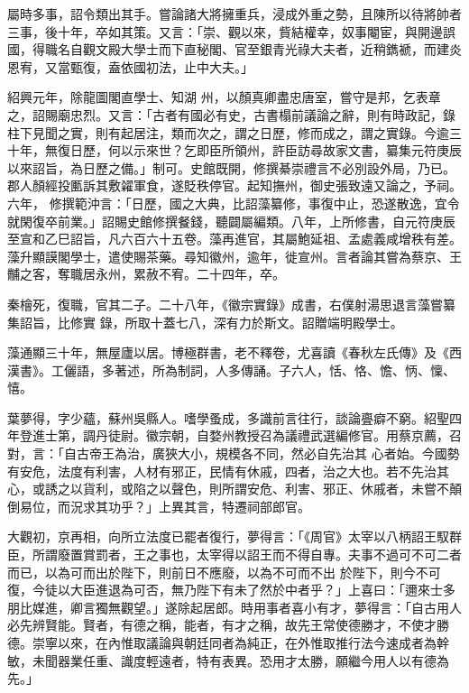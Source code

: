 \begin{pinyinscope}
 屬時多事，詔令類出其手。嘗論諸大將擁重兵，浸成外重之勢，且陳所以待將帥者三事，後十年，卒如其策。又言：「崇、觀以來，貲結權幸，奴事閹宦，與開邊誤國，得職名自觀文殿大學士而下直秘閣、官至銀青光祿大夫者，近稍鐫褫，而建炎恩宥，又當甄復，盍依國初法，止中大夫。」



 紹興元年，除龍圖閣直學士、知湖
 州，以顏真卿盡忠唐室，嘗守是邦，乞表章之，詔賜廟忠烈。又言：「古者有國必有史，古書榻前議論之辭，則有時政記，錄柱下見聞之實，則有起居注，類而次之，謂之日歷，修而成之，謂之實錄。今逾三十年，無復日歷，何以示來世？乞即臣所領州，許臣訪尋故家文書，纂集元符庚辰以來詔旨，為日歷之備。」制可。史館既開，修撰綦崇禮言不必別設外局，乃已。郡人顏經投匭訴其敷糴軍食，遂貶秩停官。起知撫州，御史張致遠又論之，予祠。六年，
 修撰範沖言：「日歷，國之大典，比詔藻纂修，事復中止，恐遂散逸，宜令就閑復卒前業。」詔賜史館修撰餐錢，聽闢屬編類。八年，上所修書，自元符庚辰至宣和乙巳詔旨，凡六百六十五卷。藻再進官，其屬鮑延祖、孟處義咸增秩有差。藻升顯謨閣學士，遣使賜茶藥。尋知徽州，逾年，徙宣州。言者論其嘗為蔡京、王黼之客，奪職居永州，累赦不宥。二十四年，卒。



 秦檜死，復職，官其二子。二十八年，《徽宗實錄》成書，右僕射湯思退言藻嘗纂集詔旨，比修實
 錄，所取十蓋七八，深有力於斯文。詔贈端明殿學士。



 藻通顯三十年，無屋廬以居。博極群書，老不釋卷，尤喜讀《春秋左氏傳》及《西漢書》。工儷語，多著述，所為制詞，人多傳誦。子六人，恬、恪、憺、怲、懍、憘。



 葉夢得，字少蘊，蘇州吳縣人。嗜學蚤成，多識前言往行，談論亹癖不窮。紹聖四年登進士第，調丹徒尉。徽宗朝，自婺州教授召為議禮武選編修官。用蔡京薦，召對，言：「自古帝王為治，廣狹大小，規模各不同，然必自先治其
 心者始。今國勢有安危，法度有利害，人材有邪正，民情有休戚，四者，治之大也。若不先治其心，或誘之以貨利，或陷之以聲色，則所謂安危、利害、邪正、休戚者，未嘗不顛倒易位，而況求其功乎？」上異其言，特遷祠部郎官。



 大觀初，京再相，向所立法度已罷者復行，夢得言：「《周官》太宰以八柄詔王馭群臣，所謂廢置賞罰者，王之事也，太宰得以詔王而不得自專。夫事不過可不可二者而已，以為可而出於陛下，則前日不應廢，以為不可而不出
 於陛下，則今不可復，今徒以大臣進退為可否，無乃陛下有未了然於中者乎？」上喜曰：「邇來士多朋比媒進，卿言獨無觀望。」遂除起居郎。時用事者喜小有才，夢得言：「自古用人必先辨賢能。賢者，有德之稱，能者，有才之稱，故先王常使德勝才，不使才勝德。崇寧以來，在內惟取議論與朝廷同者為純正，在外惟取推行法今速成者為幹敏，未聞器業任重、識度輕遠者，特有表異。恐用才太勝，願繼今用人以有德為先。」




\end{pinyinscope}
